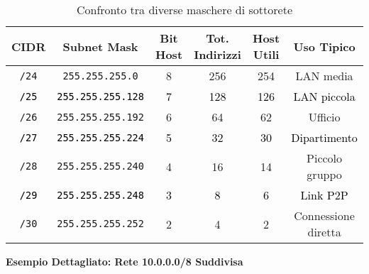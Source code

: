\begin{table}[H]
\centering
\begin{tabular}{|c|c|c|c|c|c|}
\hline
\rowcolor{bg_custom}
\textcolor{primarytext}{\textbf{CIDR}} & \textcolor{primarytext}{\textbf{Subnet Mask}} & \textcolor{primarytext}{\textbf{Bit Host}} & \textcolor{primarytext}{\textbf{Tot. Indirizzi}} & \textcolor{primarytext}{\textbf{Host Utili}} & \textcolor{primarytext}{\textbf{Uso Tipico}} \\
\hline
\texttt{/24} & \texttt{255.255.255.0} & 8 & 256 & 254 & LAN media \\
\hline
\rowcolor{retecolor!20}
\textcolor{black}{\texttt{/25}} & \textcolor{black}{\texttt{255.255.255.128}} & \textcolor{black}{7} & \textcolor{black}{128} & \textcolor{black}{126} & \textcolor{black}{LAN piccola} \\
\hline
\texttt{/26} & \texttt{255.255.255.192} & 6 & 64 & 62 & Ufficio \\
\hline
\rowcolor{hostcolor!20}
\textcolor{black}{\texttt{/27}} & \textcolor{black}{\texttt{255.255.255.224}} & \textcolor{black}{5} & \textcolor{black}{32} & \textcolor{black}{30} & \textcolor{black}{Dipartimento} \\
\hline
\texttt{/28} & \texttt{255.255.255.240} & 4 & 16 & 14 & Piccolo gruppo \\
\hline
\rowcolor{retecolor!20}
\textcolor{black}{\texttt{/29}} & \textcolor{black}{\texttt{255.255.255.248}} & \textcolor{black}{3} & \textcolor{black}{8} & \textcolor{black}{6} & \textcolor{black}{Link P2P} \\
\hline
\texttt{/30} & \texttt{255.255.255.252} & 2 & 4 & 2 & Connessione diretta \\
\hline
\end{tabular}
\caption{Confronto tra diverse maschere di sottorete}
\end{table}

\vspace{1em}

\textbf{Esempio Dettagliato: Rete 10.0.0.0/8 Suddivisa}

